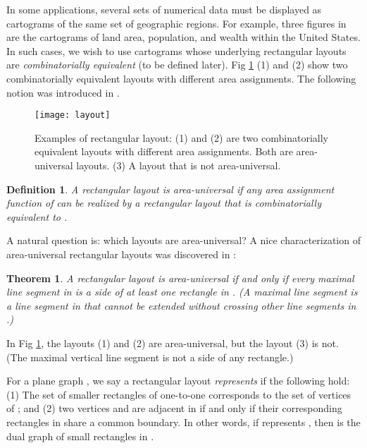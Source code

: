 \documentclass[11pt]{article}
\newtheorem{theorem}[figure]{Theorem}
\newtheorem{definition}[figure]{Definition}
\begin{document}
In some applications, several sets of numerical data must be displayed
as cartograms of the same set of geographic regions. For example,
three figures in \cite{Ra34} are the cartograms of land area,
population, and wealth within the United States. In such cases, we
wish to use cartograms whose underlying rectangular layouts are
{\em combinatorially equivalent} (to be defined later).
Fig \ref{fig:layout} (1) and (2) show two combinatorially
equivalent layouts with different area assignments.
The following notion was introduced in \cite{EMSV12}.

\begin{figure}[t]
\begin{center}
\texttt{[image: layout]}
  \centering
\caption{Examples of rectangular layout: (1) and (2) are
two combinatorially equivalent layouts with different
area assignments. Both are area-universal layouts.
(3) A layout that is not area-universal.}
\label{fig:layout}
\end{center}
\end{figure}
\begin{definition}
A rectangular layout  is {\em area-universal} if any
area assignment function  of  can be realized by a
rectangular layout that is {\em combinatorially equivalent} to .
\end{definition}



A natural question is: which layouts are area-universal?
A nice characterization of area-universal rectangular layouts was
discovered in \cite{EMSV12}:

\begin{theorem}\label{thm:universal}
A rectangular layout  is area-universal if and only
if every maximal line segment in  is a side of at
least one rectangle in .
(A maximal line segment is a line segment in  that cannot
be extended without crossing other line segments in .)
\end{theorem}

In Fig \ref{fig:layout}, the layouts (1) and (2) are area-universal,
but the layout (3) is not. (The maximal vertical line segment 
is not a side of any rectangle.)

For a plane graph , we say a rectangular layout  {\em represents}
 if the following hold: (1) The set of smaller rectangles of 
one-to-one corresponds to the set of vertices of ; and
(2) two vertices  and  are adjacent in  if and only if their
corresponding rectangles in  share a common boundary. In other words,
if  represents , then  is the dual graph of small rectangles in .
\end{document}
